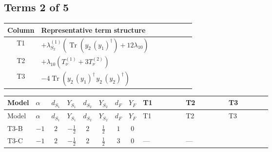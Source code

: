 \documentclass[8pt]{article}
\begin{document}
\begin{landscape}
\subsection*{Terms 2 of 5}
\begin{center}
\begin{tabular}{@{}c >{\raggedright\arraybackslash}p{0.82\linewidth}@{}}
\toprule
Column & Representative term structure \\
\midrule
T1 & \(\displaystyle +{\lambda_{S_2}^{(1)}} (\operatorname{Tr}\!\left({y_2}\,\left({y_1}\right)^{\dagger}\right)+12 {\lambda_{10}})\) \\
\midrule
T2 & \(\displaystyle +{\lambda_{10}} (T_{\nu}^{(1)}+3 T_{\nu}^{(2)})\) \\
\midrule
T3 & \(\displaystyle -4 \operatorname{Tr}\!\left({y_2}\,\left({y_1}\right)^{\dagger}\,{y_2}\,\left({y_2}\right)^{\dagger}\right)\) \\
\midrule
\bottomrule
\end{tabular}
\end{center}
\smallskip
\tiny
\begin{longtable}{@{}llcccccc >{\raggedright\arraybackslash}p{0.21\linewidth} >{\raggedright\arraybackslash}p{0.21\linewidth} >{\raggedright\arraybackslash}p{0.21\linewidth}@{}}
\toprule
Model & $\alpha$ & $d_{S_1}$ & $Y_{S_1}$ & $d_{S_2}$ & $Y_{S_2}$ & $d_F$ & $Y_F$ & T1 & T2 & T3 \\
\midrule
\endfirsthead
\toprule
Model & $\alpha$ & $d_{S_1}$ & $Y_{S_1}$ & $d_{S_2}$ & $Y_{S_2}$ & $d_F$ & $Y_F$ & T1 & T2 & T3 \\
\midrule
\endhead
T3-B & $-1$ & $2$ & $-\frac{1}{2}$ & $2$ & $\frac{1}{2}$ & $1$ & $0$ & \scriptsize\adjustbox{max width=\linewidth}{$\begin{gathered} +{\lambda_{S_2}^{(1)}} (\operatorname{Tr}\!\left({y_2}\,\left({y_1}\right)^{\dagger}\right)+12 {\lambda_{10}})\end{gathered}$} & \scriptsize\adjustbox{max width=\linewidth}{$\begin{gathered} +{\lambda_{10}} (T_{\nu}^{(1)}+3 T_{\nu}^{(2)})\end{gathered}$} & \scriptsize\adjustbox{max width=\linewidth}{$\begin{gathered} -4 \operatorname{Tr}\!\left({y_2}\,\left({y_1}\right)^{\dagger}\,{y_2}\,\left({y_2}\right)^{\dagger}\right)\end{gathered}$} \\
\midrule
T3-C & $-1$ & $2$ & $-\frac{1}{2}$ & $2$ & $\frac{1}{2}$ & $3$ & $0$ & --- & --- & \scriptsize\adjustbox{max width=\linewidth}{$\begin{gathered} -5 \operatorname{Tr}\!\left({y_2}\,\left({y_1}\right)^{\dagger}\,{y_2}\,\left({y_2}\right)^{\dagger}\right)\end{gathered}$} \\

\end{longtable}
\end{landscape}
\end{document}
